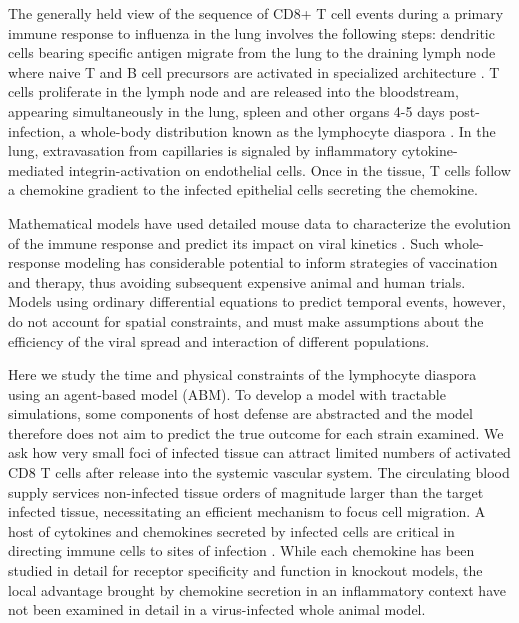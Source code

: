 \documentclass[10pt]{article}
\begin{document}
The generally held view of the sequence of CD8+ T cell events during a primary immune response to influenza in the lung involves the following steps: dendritic cells bearing specific antigen migrate from the lung to the draining lymph node where naive T and B cell precursors are activated in specialized architecture \cite{Saenz2010, Beltman2007, Handel2008, Zheng2008, Ingulli2009, Allan1990}.  T cells proliferate in the lymph node and are released into the bloodstream, appearing simultaneously in the lung, spleen and other organs 4-5 days post-infection, a whole-body distribution known as the lymphocyte diaspora \cite{Thelen2008}.  In the lung, extravasation from capillaries is signaled by inflammatory cytokine-mediated integrin-activation on endothelial cells.  Once in the tissue, T cells follow a chemokine gradient to the infected epithelial cells secreting the chemokine.

Mathematical models have used detailed mouse data to characterize the evolution of the immune response and predict its impact on viral kinetics \cite{Thomas-Vaslin2008, Beauchemin2008, Smith2010, Thakar2010, Burrowes2004}.  Such whole-response modeling has considerable potential to inform strategies of vaccination and therapy, thus avoiding subsequent expensive animal and human trials.  Models using ordinary differential equations to predict temporal events, however, do not account for spatial constraints, and must make assumptions about the efficiency of the viral spread and interaction of different populations. 

Here we study the time and physical constraints of the lymphocyte diaspora using an agent-based model (ABM).  To develop a model with tractable simulations, some components of host defense are abstracted and the model therefore does not aim to predict the true outcome for each strain examined.   We ask how very small foci of infected tissue can attract limited numbers of activated CD8 T cells after release into the systemic vascular system.  The circulating blood supply services non-infected tissue orders of magnitude larger than the target infected tissue, necessitating an efficient mechanism to focus cell migration.   A host of cytokines and chemokines secreted by infected cells are critical in directing immune cells to sites of infection \cite{Miao2010, Zhao2000, LiJeon2002}.  While each chemokine has been studied in detail for receptor specificity and function in knockout models, the local advantage brought by chemokine secretion in an inflammatory context have not been examined in detail in a virus-infected whole animal model.  
\end{document}
